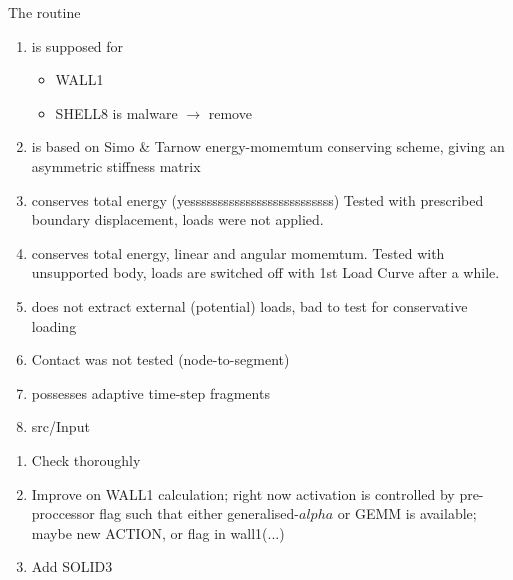 The routine
\begin{enumerate}
\item is supposed for
  \begin{itemize}
  \item WALL1
  \item SHELL8 is malware $\to$ remove
  \end{itemize}
\item is based on Simo \& Tarnow energy-momemtum conserving scheme, giving
  an asymmetric stiffness matrix 
\item conserves total energy (yessssssssssssssssssssssssss) Tested with
  prescribed boundary displacement, loads were not applied.
\item conserves total energy, linear and angular momemtum. Tested with
  unsupported body, loads are switched off with 1st Load Curve after a while. 
\item does not extract external (potential) loads, bad to test for
  conservative loading 
\item Contact was not tested (node-to-segment)
\item possesses adaptive time-step fragments
\item src/Input 
\end{enumerate}

\begin{enumerate}
\item Check thoroughly
\item Improve on WALL1 calculation; right now activation is controlled by
  pre-proccessor flag such that either generalised-$alpha$ or GEMM is
  available; maybe new ACTION, or flag in wall1(...)
\item Add SOLID3
\end{enumerate}

